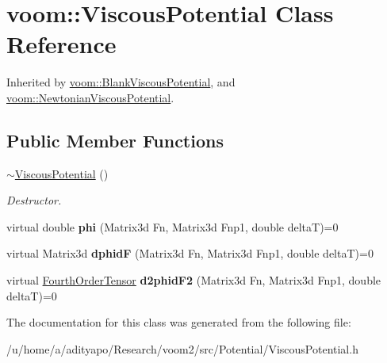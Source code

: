 \hypertarget{classvoom_1_1_viscous_potential}{
\section{voom::ViscousPotential Class Reference}
\label{classvoom_1_1_viscous_potential}
}


Inherited by \hyperlink{classvoom_1_1_blank_viscous_potential}{voom::BlankViscousPotential}, and \hyperlink{classvoom_1_1_newtonian_viscous_potential}{voom::NewtonianViscousPotential}.\subsection*{Public Member Functions}
\begin{DoxyCompactItemize}
\item 
\hypertarget{classvoom_1_1_viscous_potential_aba85c75a536cc0cf6affc5cc731cfde4}{
\hyperlink{classvoom_1_1_viscous_potential_aba85c75a536cc0cf6affc5cc731cfde4}{$\sim$ViscousPotential} ()}
\label{classvoom_1_1_viscous_potential_aba85c75a536cc0cf6affc5cc731cfde4}

\begin{DoxyCompactList}\small\item\em Destructor. \item\end{DoxyCompactList}\item 
\hypertarget{classvoom_1_1_viscous_potential_a78e49130cc85eb0432e67498f00c0213}{
virtual double {\bfseries phi} (Matrix3d Fn, Matrix3d Fnp1, double deltaT)=0}
\label{classvoom_1_1_viscous_potential_a78e49130cc85eb0432e67498f00c0213}

\item 
\hypertarget{classvoom_1_1_viscous_potential_af1f930b4408e784dea155813d751ffb7}{
virtual Matrix3d {\bfseries dphidF} (Matrix3d Fn, Matrix3d Fnp1, double deltaT)=0}
\label{classvoom_1_1_viscous_potential_af1f930b4408e784dea155813d751ffb7}

\item 
\hypertarget{classvoom_1_1_viscous_potential_a2151290d9ae261d22dab19bbf0c84b67}{
virtual \hyperlink{classvoom_1_1_fourth_order_tensor}{FourthOrderTensor} {\bfseries d2phidF2} (Matrix3d Fn, Matrix3d Fnp1, double deltaT)=0}
\label{classvoom_1_1_viscous_potential_a2151290d9ae261d22dab19bbf0c84b67}

\end{DoxyCompactItemize}


The documentation for this class was generated from the following file:\begin{DoxyCompactItemize}
\item 
/u/home/a/adityapo/Research/voom2/src/Potential/ViscousPotential.h\end{DoxyCompactItemize}
